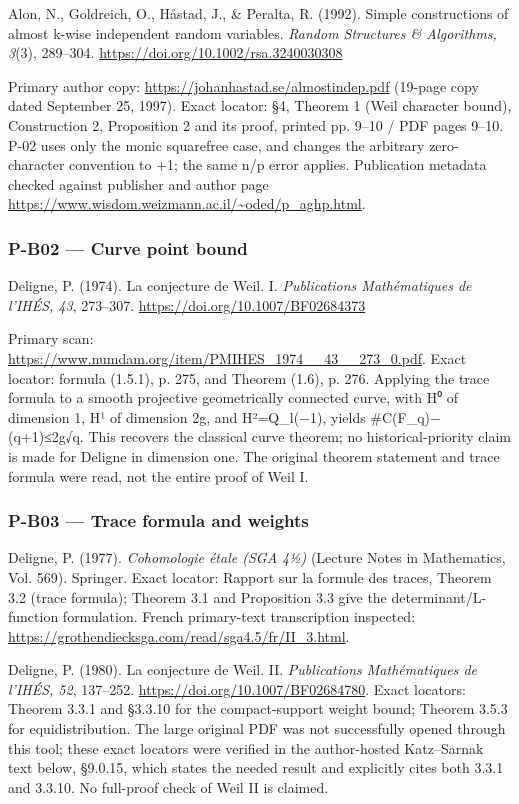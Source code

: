 \documentclass[11pt,a4paper]{article}
\theoremstyle{definition}\newtheorem{definition}{Definition}
\begin{document}
Alon, N., Goldreich, O., Håstad, J., \& Peralta, R. (1992). Simple
constructions of almost k-wise independent random variables.
\emph{Random Structures \& Algorithms, 3}(3), 289--304.
\url{https://doi.org/10.1002/rsa.3240030308}

Primary author copy: \url{https://johanhastad.se/almostindep.pdf}
(19-page copy dated September 25, 1997). Exact locator: §4, Theorem 1
(Weil character bound), Construction 2, Proposition 2 and its proof,
printed pp. 9--10 / PDF pages 9--10. P-02 uses only the monic squarefree
case, and changes the arbitrary zero-character convention to +1; the
same n/p error applies. Publication metadata checked against publisher
and author page
\url{https://www.wisdom.weizmann.ac.il/~oded/p_aghp.html}.

\subsubsection{P-B02 --- Curve point
bound}\label{p-b02--curve-point-bound}

Deligne, P. (1974). La conjecture de Weil. I. \emph{Publications
Mathématiques de l'IHÉS, 43}, 273--307.
\url{https://doi.org/10.1007/BF02684373}

Primary scan:
\url{https://www.numdam.org/item/PMIHES_1974__43__273_0.pdf}. Exact
locator: formula (1.5.1), p. 275, and Theorem (1.6), p. 276. Applying
the trace formula to a smooth projective geometrically connected curve,
with H⁰ of dimension 1, H¹ of dimension 2g, and H²=Q\_l(−1), yields
\textbar\#C(F\_q)−(q+1)\textbar≤2g√q. This recovers the classical curve
theorem; no historical-priority claim is made for Deligne in dimension
one. The original theorem statement and trace formula were read, not the
entire proof of Weil I.

\subsubsection{P-B03 --- Trace formula and
weights}\label{p-b03--trace-formula-and-weights}

Deligne, P. (1977). \emph{Cohomologie étale (SGA 4½)} (Lecture Notes in
Mathematics, Vol. 569). Springer. Exact locator: Rapport sur la formule
des traces, Theorem 3.2 (trace formula); Theorem 3.1 and Proposition 3.3
give the determinant/L-function formulation. French primary-text
transcription inspected:
\url{https://grothendiecksga.com/read/sga4.5/fr/II_3.html}.

Deligne, P. (1980). La conjecture de Weil. II. \emph{Publications
Mathématiques de l'IHÉS, 52}, 137--252.
\url{https://doi.org/10.1007/BF02684780}. Exact locators: Theorem 3.3.1
and §3.3.10 for the compact-support weight bound; Theorem 3.5.3 for
equidistribution. The large original PDF was not successfully opened
through this tool; these exact locators were verified in the
author-hosted Katz--Sarnak text below, §9.0.15, which states the needed
result and explicitly cites both 3.3.1 and 3.3.10. No full-proof check
of Weil II is claimed.
\end{document}
